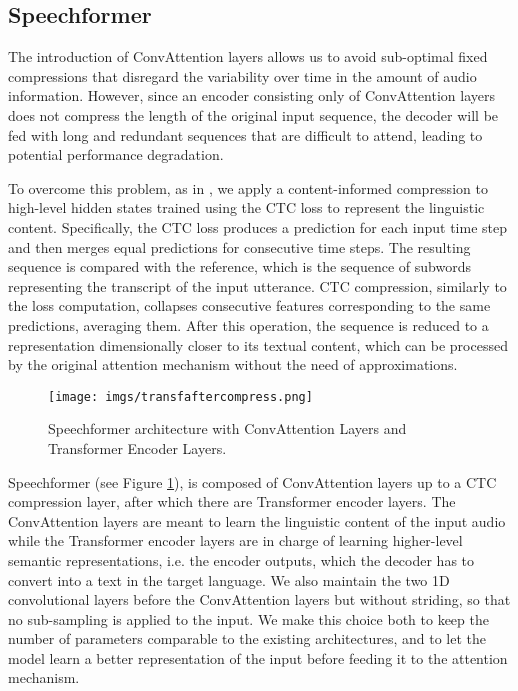 \documentclass[11pt]{article}
\begin{document}
\subsection{Speechformer}
\label{sec:speechformer}
The introduction of ConvAttention layers allows us to avoid 
sub-optimal fixed compressions that disregard the variability over time in the amount of audio information.
However, since an encoder 
consisting only of
ConvAttention layers does not compress the length of the original input sequence, the decoder will be fed with long and redundant sequences that are difficult to attend, leading to potential performance degradation.



To overcome this problem, as in \citep{liu2020bridging,gaido-etal-2021-ctc}, we apply a content-informed compression to high-level hidden states trained using the CTC loss \cite{Graves2006ConnectionistTC} to represent the linguistic content.
Specifically, the CTC loss produces a prediction for each input time step and then merges equal predictions for consecutive time steps.
The resulting sequence is compared with the reference, which is the sequence of subwords representing the transcript of the input utterance. 
CTC compression, similarly to the loss computation, collapses consecutive features corresponding to the same predictions, averaging them.
After this operation, the sequence is reduced to a representation dimensionally closer to its textual content, which can be processed by the original attention mechanism without the need of approximations.

\begin{figure}[tb]
\hspace*{1.5cm}
\texttt{[image: imgs/transfaftercompress.png]}
\caption{Speechformer architecture with \textit{} ConvAttention Layers and \textit{} Transformer Encoder Layers.}
\label{fig:hybrid}
\end{figure}

Speechformer (see Figure \ref{fig:hybrid}), is composed of  ConvAttention layers up to a CTC compression layer, after which there are  Transformer encoder layers.
The  ConvAttention layers are meant to learn the linguistic content of the input audio while the  Transformer encoder layers are in charge of learning higher-level semantic representations, i.e. the encoder outputs, which the decoder has to convert into a text in the target language.
We also maintain the two 1D convolutional layers before the ConvAttention layers but without striding, so that no sub-sampling is applied to the input. We make this choice both to keep the number of parameters comparable to the existing architectures, and to let the model learn a better representation of the input before feeding it to the attention mechanism.
\end{document}
